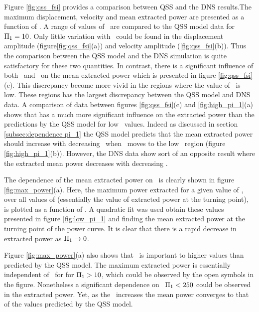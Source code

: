 Figure \ref{fig:qss_fsi} provides a comparison between QSS and the DNS results.The maximum displacement, velocity and mean extracted power are presented as a function of \massdamp. A range of values of \massstiff\ are compared to the QSS model data for $\Pi_1 = 10$. Only little variation with \massstiff \ could be found in  the displacement amplitude (figure\ref{fig:qss_fsi}(a)) and velocity amplitude (\ref{fig:qss_fsi}(b)). Thus the comparison between the QSS model and the DNS simulation is quite satisfactory for these two quantities. In contrast, there is a significant influence of both \massstiff\ and \massdamp\ on the mean extracted power which is  presented in figure \ref{fig:qss_fsi}(c). This discrepancy become more vivid in the regions where the value of \massstiff\ is low. These regions has the largest discrepancy between the QSS model and DNS data. A comparison of data between figures \ref{fig:qss_fsi}(c) and \ref{fig:high_pi_1}(a) shows that \massstiff has a much more significant influence on the extracted power than the predictions by the QSS model for low \massstiff\ values. Indeed as discussed in section \ref{subsec:dependence pi_1} the QSS model predicts that the mean extracted power should increase with decreasing \massstiff\ when \massstiff\ moves to the low \massstiff\ region (figure \ref{fig:high_pi_1}(b)). However, the DNS data show sort of an opposite result where the extracted mean power decreases with decreasing \massstiff.






The dependence of the mean extracted power on \massstiff\ is clearly shown in figure \ref{fig:max_power}(a).  Here, the maximum power extracted for a given value of \massstiff, over all values of \massdamp (essentially the value of extracted power at the turning point), is plotted as a function of \massstiff. A quadratic fit was used obtain these values presented in figure \ref{fig:low_pi_1} and finding the mean extracted power at the turning point of the power curve. It is clear that there is a rapid decrease in extracted power as $\Pi_1 \rightarrow 0$. 



Figure \ref{fig:max_power}(a) also shows that \massstiff\ is important to higher values than predicted by the QSS model. The maximum extracted power is essentially independent of \massstiff\ for for $\Pi_1>10$, which could be observed by the open symbols in the figure. Nonetheless a significant dependence on \massstiff\  $\Pi_1<250$ could be observed in the extracted power. Yet, as the \massstiff\ increases the mean power converges to that of the values predicted by the QSS model.

